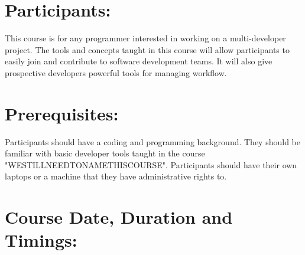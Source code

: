 \documentclass[a4paper,11pt]{article}
\begin{document}
\section{Participants:}
This course is for any programmer interested in working on a multi-developer project. The tools and concepts taught in this course will allow participants to easily join and contribute to software development teams. It will also give prospective developers powerful tools for managing workflow.

\section{Prerequisites:}
Participants should have a coding and programming background. They should be familiar with basic developer tools taught in the course "WESTILLNEEDTONAMETHISCOURSE". Participants should have their own laptops or a machine that they have administrative rights to.

\section{Course Date, Duration and Timings:}
\end{document}
